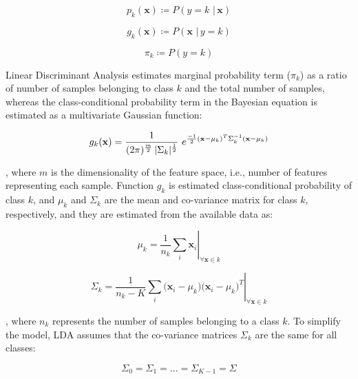 \begin{equation} 
p_k(\mathbf{x}) \coloneqq P(y=k \,\, | \, \mathbf{x})
\end{equation}

\begin{equation} 
g_k(\mathbf{x}) \coloneqq P(\mathbf{x}  \,\, | \, y=k)
\end{equation}

\begin{equation} 
\pi_k \coloneqq P(y=k)
\end{equation}


Linear Discriminant Analysis estimates marginal probability term ($\pi_k$) as a ratio of number of samples belonging to class $k$ and the total  number of samples, whereas the class-conditional probability term in the Bayesian equation is estimated as a multivariate Gaussian function:

\begin{equation} 
g_k(\mathbf{x}) = \frac{1}{(2 \pi)^{\nicefrac{m}{2}}\, |\Sigma_k|^{\nicefrac{1}{2}}}\,\, e^{\nicefrac{-1}{2}  (\mathbf{x}-\mu_k)^T  \Sigma_k^{-1} (\mathbf{x}-\mu_k)} 
\end{equation}

\noindent
, where $m$ is the dimensionality of the feature space, i.e., number of features representing each sample. Function $g_k$ is estimated class-conditional probability of class $k$, and $\mu_k$ and $\Sigma_k$ are the mean and co-variance matrix for class $k$, respectively, and they are estimated from the available data as:

\begin{equation}
\left. \mu_k = \frac{1}{n_k} \sum_{i}{\mathbf{x}_i} \right\vert_{\forall \mathbf{x} \in k}
\end{equation}

\begin{equation}
\left. \Sigma_k = \frac{1}{n_k-K} \sum_{i}{\Big( \mathbf{x}_i - \mu_k \Big) \Big( \mathbf{x}_i - \mu_k \Big)^T} \right\vert_{\forall \mathbf{x} \in k}
\end{equation}

 
\noindent
, where $n_k$ represents the number of samples belonging to a class $k$.
To simplify the model, LDA assumes that the co-variance matrices $\Sigma_k$ are the same for all classes:

\begin{equation} 
\Sigma_0 = \Sigma_1 = \dots = \Sigma_{K-1} = \Sigma
\end{equation}

